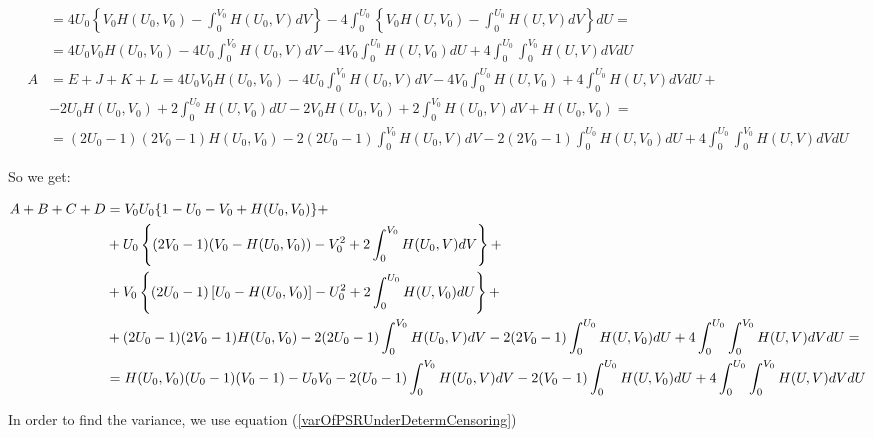 \documentclass[]{article}
\begin{document}
{{$$\begin{aligned}
    &= 4 U_0  \left\{  V_0 H(U_0, V_0) -  \int_0^{V_0} H(U_0, V)dV   \right\} -  4\int_0^{U_0} \left\{  V_0H(U,V_0)  -  \int_0^{U_0} H(U, V) dV \right\} dU = \\
    &= 4 U_0 V_0 H(U_0, V_0) -  4U_0\int_0^{V_0} H(U_0, V)dV   -  4 V_0 \int_0^{U_0}  H(U,V_0)dU  + 4 \int_0^{U_0}\int_0^{V_0} H(U, V) dV dU\\
    A &= E + J + K + L = 4 U_0 V_0 H(U_0, V_0) -  4U_0\int_0^{V_0} H(U_0, V)dV   -  4 V_0 \int_0^{U_0}  H(U,V_0)  + 4 \int_0^{U_0} H(U, V) dV  dU + \\
    & -2  U_0 H(U_0, V_0) +  2 \int_0^{U_0}  H(U, V_0)dU  -2  V_0 H(U_0, V_0) +  2 \int_0^{V_0}  H(U_0, V)dV +  H(U_0, V_0) =\\
    &= (2U_0 - 1)(2V_0 - 1)H(U_0, V_0) - 2(2U_0 - 1)\int_0^{V_0} H(U_0, V)dV  - 2(2V_0 - 1)\int_0^{U_0} H(U, V_0)dU  + 4 \int_0^{U_0}\int_0^{V_0} H(U, V) dV  dU
	\end{aligned}
	$$

}}

So we get:


{\scriptsize{
	$$
	\begin{aligned}
    A+B+C+D &=  V_0 U_0 \large\{1 - U_0 - V_0  + H(U_0, V_0)\large\}+\\
    &+ U_0  \left\{  (2V_0 - 1)(V_0 - H(U_0, V_0)) - V_0^2 + 2 \int_0^{V_0} H(U_0, V)dV   \right\}+\\
    &+ V_0 \left\{  (2U_0 - 1) \left[U_0 - H(U_0, V_0)\right]  - U_0^2 + 2 \int_0^{U_0} H(U, V_0)dU  \right\}+\\
    &+ (2U_0 - 1)(2V_0 - 1)H(U_0, V_0) - 2(2U_0 - 1)\int_0^{V_0} H(U_0, V)dV  - 2(2V_0 - 1)\int_0^{U_0} H(U, V_0)dU  + 4 \int_0^{U_0}\int_0^{V_0} H(U, V) dV  dU =\\
    &= H(U_0, V_0)(U_0 - 1)(V_0 - 1) - U_0 V_0 - 2(U_0 - 1)\int_0^{V_0} H(U_0, V)dV  - 2(V_0 - 1)\int_0^{U_0} H(U, V_0)dU  + 4 \int_0^{U_0}\int_0^{V_0} H(U, V) dV  dU 
	\end{aligned}
	$$

}}



In order to find the variance, we use equation (\ref{varOfPSRUnderDetermCensoring})
\end{document}
